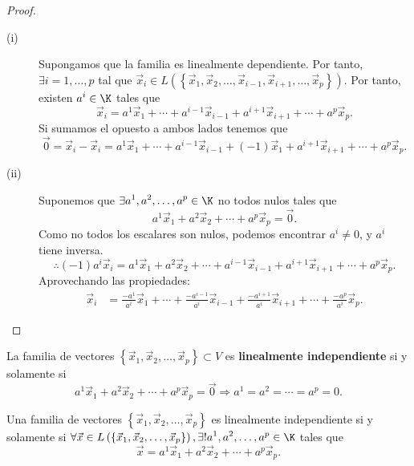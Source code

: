 \begin{proof}
\begin{description}
\item[(i)] Supongamos que la familia es linealmente dependiente. Por tanto, $\displaystyle \exists i = 1, \ldots, p $ tal que $\displaystyle \vec{x}_{i} \in L\left(\left\{ \vec{x}_{1}, \vec{x}_{2}, \ldots, \vec{x}_{i-1}, \vec{x}_{i+1}, \ldots, \vec{x}_{p}\right\}\right) $. Por tanto, existen $\displaystyle a^{i}\in\K $ tales que 
	\[\vec{x}_{i} = a^{1}\vec{x}_{1} + \cdots + a^{i-1}\vec{x}_{i-1} + a^{i+1}\vec{x}_{i+1} + \cdots + a^{p}\vec{x}_{p} .\]
Si sumamos el opuesto a ambos lados tenemos que 
\[ \vec{0} = \vec{x}_{i} - \vec{x}_{i} = a^{1}\vec{x}_{1} + \cdots + a^{i-1}\vec{x}_{i-1} +\left(-1\right)\vec{x}_{1} + a^{i+1}\vec{x}_{i+1} + \cdots + a^{p}\vec{x}_{p} .\]
\item[(ii)] Suponemos que $\displaystyle \exists a^{1}, a^{2}, \ldots, a^{p} \in \K $ no todos nulos tales que 
	\[a^{1}\vec{x}_{1} + a^{2}\vec{x}_{2} + \cdots + a^{p}\vec{x}_{p} = \vec{0} .\]
Como no todos los escalares son nulos, podemos encontrar $\displaystyle a^{i} \neq 0 $, y $\displaystyle a^{i} $ tiene inversa. 
\[\therefore \left(-1\right)a^{i}\vec{x}_{i} = a^{1}\vec{x}_{1} + a^{2}\vec{x}_{2} + \cdots + a^{i-1}\vec{x}_{i-1}+a^{i+1}\vec{x}_{i+1} + \cdots + a^{p}\vec{x}_{p} .\]
Aprovechando las propiedades:
\[
\begin{split}
\vec{x}_{i} & = \frac{-a^{1}}{a^{i}}\vec{x}_{1} + \cdots + \frac{-a^{i-1}}{a^{i}}\vec{x}_{i-1}+  \frac{-a^{i+1}}{a^{i}}\vec{x}_{i+1} + \cdots + \frac{-a^{p}}{a^{i}}\vec{x}_{p}.
\end{split}
\]
\end{description}
\end{proof}

\begin{fcolorary}[]
\normalfont La familia de vectores $\displaystyle \left\{ \vec{x}_{1}, \vec{x}_{2}, \ldots, \vec{x}_{p}\right\} \subset V  $ es \textbf{linealmente independiente} si y solamente si 
\[a^{1}\vec{x}_{1} + a^{2}\vec{x}_{2} + \cdots + a^{p}\vec{x}_{p} = \vec{0} \Rightarrow a^{1} = a^{2}= \cdots = a^{p} = 0 .\]
\end{fcolorary}


\begin{ftheorem}[]
\normalfont Una familia de vectores $\displaystyle \left\{ \vec{x}_{1}, \vec{x}_{2}, \ldots, \vec{x}_{p}\right\}  $ es linealmente independiente si y solamente si $\displaystyle \forall \vec{x} \in L\left(\left\{ \vec{x}_{1}, \vec{x}_{2}, \ldots, \vec{x}_{p}\right\} \right), \exists! a^{1}, a^{2}, \ldots, a^{p} \in \K $ tales que 
\[\vec{x} = a^{1}\vec{x}_{1} + a^{2}\vec{x}_{2} + \cdots + a^{p}\vec{x}_{p} .\]
\end{ftheorem}

